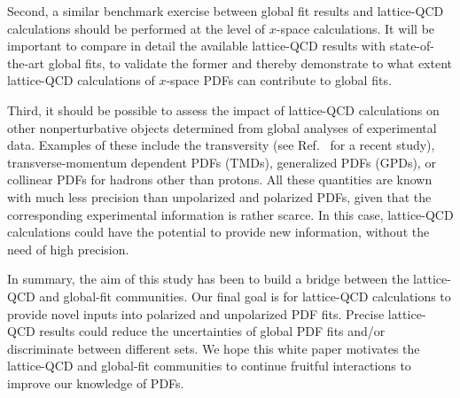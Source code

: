 Second, a similar benchmark exercise between global fit results and 
lattice-QCD calculations should be performed at the level of
$x$-space calculations.
%
It will be important to compare in detail the available lattice-QCD results 
with state-of-the-art global fits, to validate the former and
thereby demonstrate to what extent lattice-QCD calculations of $x$-space PDFs 
can contribute to global fits.

Third, it should be possible to assess the impact of lattice-QCD 
calculations on other nonperturbative objects
determined from global analyses of experimental data.
%
Examples of these include the transversity (see Ref.~\cite{Lin:2017stx}
for a recent study), transverse-momentum dependent 
PDFs (TMDs), generalized PDFs (GPDs), or collinear PDFs for hadrons 
other than protons.
%
All these quantities are known with much less precision than unpolarized
and polarized PDFs, given that the corresponding experimental information
is rather scarce. 
%
In this case, lattice-QCD calculations could have the potential
to provide new information, without the need of high precision.

In summary, the aim of this study has been to build a bridge between the 
lattice-QCD and global-fit communities.
%
Our final goal is for lattice-QCD calculations to provide novel inputs into 
polarized and unpolarized PDF fits. 
%
Precise lattice-QCD results could reduce the uncertainties of
global PDF fits and/or discriminate between different sets.
%
We hope this white paper motivates the lattice-QCD and global-fit
communities to continue fruitful interactions to improve our knowledge of PDFs.
